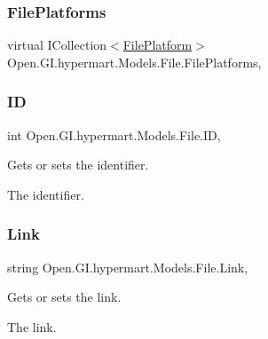 \subsubsection{\texorpdfstring{File\+Platforms}{FilePlatforms}}
{\footnotesize\ttfamily virtual I\+Collection$<$\hyperlink{class_open_1_1_g_i_1_1hypermart_1_1_models_1_1_file_platform}{File\+Platform}$>$ Open.\+G\+I.\+hypermart.\+Models.\+File.\+File\+Platforms\hspace{0.3cm}{\ttfamily [get]}, {\ttfamily [set]}}

\hypertarget{class_open_1_1_g_i_1_1hypermart_1_1_models_1_1_file_ade215e549b777e8f30cfa19ec28cff96}{}\label{class_open_1_1_g_i_1_1hypermart_1_1_models_1_1_file_ade215e549b777e8f30cfa19ec28cff96} 
\subsubsection{\texorpdfstring{ID}{ID}}
{\footnotesize\ttfamily int Open.\+G\+I.\+hypermart.\+Models.\+File.\+ID\hspace{0.3cm}{\ttfamily [get]}, {\ttfamily [set]}}



Gets or sets the identifier. 

The identifier. \hypertarget{class_open_1_1_g_i_1_1hypermart_1_1_models_1_1_file_a47b36d33252b1a1f58bee02a94d11dd5}{}\label{class_open_1_1_g_i_1_1hypermart_1_1_models_1_1_file_a47b36d33252b1a1f58bee02a94d11dd5} 
\subsubsection{\texorpdfstring{Link}{Link}}
{\footnotesize\ttfamily string Open.\+G\+I.\+hypermart.\+Models.\+File.\+Link\hspace{0.3cm}{\ttfamily [get]}, {\ttfamily [set]}}



Gets or sets the link. 

The link. \hypertarget{class_open_1_1_g_i_1_1hypermart_1_1_models_1_1_file_a7cf38ed851b70df6af9b0606c4d744ed}{}\label{class_open_1_1_g_i_1_1hypermart_1_1_models_1_1_file_a7cf38ed851b70df6af9b0606c4d744ed} 

